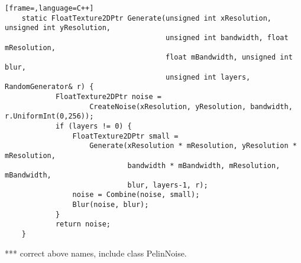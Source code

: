 \begin{lstlisting}[frame=,language=C++]
    static FloatTexture2DPtr Generate(unsigned int xResolution, unsigned int yResolution,
                                      unsigned int bandwidth, float mResolution,
                                      float mBandwidth, unsigned int blur,
                                      unsigned int layers, RandomGenerator& r) {
            FloatTexture2DPtr noise =
                    CreateNoise(xResolution, yResolution, bandwidth, r.UniformInt(0,256));
            if (layers != 0) {
                FloatTexture2DPtr small = 
                    Generate(xResolution * mResolution, yResolution * mResolution, 
                             bandwidth * mBandwidth, mResolution, mBandwidth,
                             blur, layers-1, r);
                noise = Combine(noise, small);
                Blur(noise, blur);
            }
            return noise;
    }
\end{lstlisting}

*** correct above names, include class PelinNoise.

